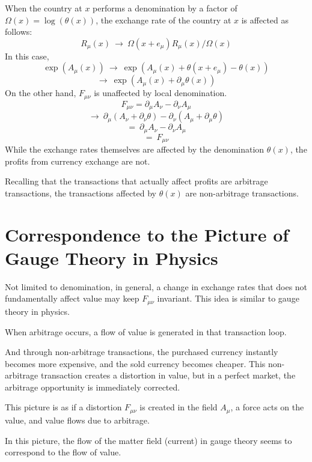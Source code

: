 \documentclass[uplatex]{jsarticle}
\begin{document}
When the country at $x$ performs a denomination by a factor of $\Omega(x) = \log (\theta (x))$, the exchange rate of the country at $x$ is affected as follows:
$$
	R_{\mu}(x) \ \to \ \Omega(x + e_{\mu}) R_{\mu}(x) / \Omega(x)
$$
In this case,
$$
	\exp (A_{\mu}(x))
	\ \to \
	\exp (A_{\mu}(x) + \theta(x+e_{\mu}) - \theta(x))
$$
$$
	\to \ \exp (A_{\mu}(x) + \partial_{\mu} \theta (x))
$$
On the other hand, $F_{\mu \nu}$ is unaffected by local denomination.
$$
	F_{\mu \nu}
	=
	\partial_{\mu} A_{\nu}
	-
	\partial_{\nu} A_{\mu}
$$
$$
	\to \
	\partial_{\mu} ( A_{\nu} + \partial_{\nu} \theta )
	-
	\partial_{\nu} ( A_{\mu} + \partial_{\mu} \theta )
$$
$$
	= \
	\partial_{\mu} A_{\nu}
	-
	\partial_{\nu} A_{\mu}
$$
$$
	= \
	F_{\mu \nu}
$$
While the exchange rates themselves are affected by the denomination $\theta(x)$, the profits from currency exchange are not.

Recalling that the transactions that actually affect profits are arbitrage transactions, the transactions affected by $\theta(x)$ are non-arbitrage transactions.



\section{\textbf{Correspondence to the Picture of Gauge Theory in Physics}}

Not limited to denomination, in general, a change in exchange rates that does not fundamentally affect value may keep $F_{\mu \nu}$ invariant. This idea is similar to gauge theory in physics.

When arbitrage occurs, a flow of value is generated in that transaction loop.

And through non-arbitrage transactions, the purchased currency instantly becomes more expensive, and the sold currency becomes cheaper. This non-arbitrage transaction creates a distortion in value, but in a perfect market, the arbitrage opportunity is immediately corrected.

This picture is as if a distortion $F_{\mu \nu}$ is created in the field $A_{\mu}$, a force acts on the value, and value flows due to arbitrage.

In this picture, the flow of the matter field (current) in gauge theory seems to correspond to the flow of value.
\end{document}

